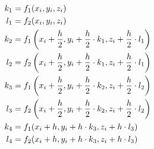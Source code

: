 \documentclass{report}
\begin{document}
\begin{align*}
	k_1 & = f_1(x_i,y_i,z_i)                                                                   \\
	l_1 & = f_2(x_i,y_i,z_i)                                                                   \\
	k_2 & = f_1\left(x_i + \frac{h}{2},y_i + \frac{h}{2}\cdot k_1,z_i + \frac{h}{2}\cdot l_1\right) \\
	l_2 & = f_2\left(x_i + \frac{h}{2},y_i + \frac{h}{2}\cdot k_1,z_i + \frac{h}{2}\cdot l_1\right) \\
	k_3 & = f_1\left(x_i + \frac{h}{2},y_i + \frac{h}{2}\cdot k_2,z_i + \frac{h}{2}\cdot l_2\right) \\
	l_3 & = f_2\left(x_i + \frac{h}{2},y_i + \frac{h}{2}\cdot k_2,z_i + \frac{h}{2}\cdot l_2\right) \\
	k_4 & = f_1(x_i + h,y_i + h\cdot k_3,z_i + h\cdot l_3)                                     \\
	l_4 & = f_2(x_i + h,y_i + h\cdot k_3,z_i + h\cdot l_3)
\end{align*}
\end{document}
